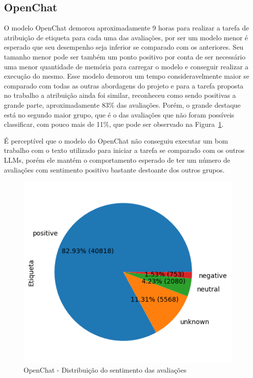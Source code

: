 \subsection{OpenChat}
\label{sec:resultados:subsec:openchat}

O modelo OpenChat demorou aproximadamente 9 horas para realizar a tarefa de atribuição de etiqueta para cada uma das avaliações, por ser um modelo menor é esperado que seu desempenho seja inferior se comparado com os anteriores. Seu tamanho menor pode ser também um ponto positivo por conta de ser necessário uma menor quantidade de memória para carregar o modelo e conseguir realizar a execução do mesmo. Esse modelo demorou um tempo consideravelmente maior se comparado com todas as outras abordagens do projeto e para a tarefa proposta no trabalho a atribuição ainda foi similar, reconheceu como sendo positivas a grande parte, aproximadamente 83\% das avaliações. Porém, o grande destaque está no segundo maior grupo, que é o das avaliações que não foram possíveis classificar, com pouco mais de 11\%, que pode ser observado na Figura~\ref{img:openchat_pizza_distribuicao}.

É perceptível que o modelo do OpenChat não conseguiu executar um bom trabalho com o texto utilizado para iniciar a tarefa se comparado com os outros LLMs, porém ele mantém o comportamento esperado de ter um número de avaliações com sentimento positivo bastante destoante dos outros grupos.

\begin{figure}
	\centering
	\includegraphics{figs/openchat/distribuicao_pizza.png}
	\caption{OpenChat - Distribuição do sentimento das avaliações}
	\label{img:openchat_pizza_distribuicao}
\end{figure}

